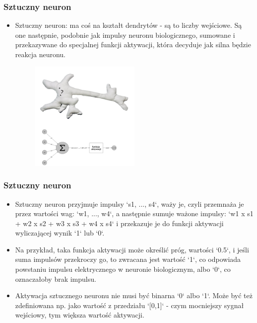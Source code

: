 \documentclass{beamer}
\begin{document}
\begin{frame}[fragile]
\frametitle{Sztuczny neuron}
\begin{itemize}
\item Sztuczny neuron: ma coś na kształt dendrytów - są to liczby wejściowe.  Są one następnie, podobnie jak impulsy neuronu biologicznego, sumowane i przekazywane do specjalnej funkcji aktywacji, która decyduje jak silna będzie reakcja neuronu.

                    \begin{figure}[h]
                        \centering
                        \includegraphics[width=0.5\textwidth]{../../img/neuron.png}
                    \end{figure}                    
                    \end{itemize}
\end{frame}

\begin{frame}[fragile]
\frametitle{Sztuczny neuron}
\begin{itemize}
\item Sztuczny neuron przyjmuje impulsy `s1, ..., s4`, waży je, czyli przemnaża je przez wartości wag: `w1, ..., w4`, a następnie sumuje ważone impulsy: `w1 x s1 + w2 x s2 + w3 x s3 + w4 x s4` i przekazuje je do funkcji aktywacji wyliczającej wynik `1` lub `0`.
\item Na przykład, taka funkcja aktywacji może określić próg, wartości `0.5`, i jeśli suma impulsów przekroczy go, to zwracana jest wartość `1`, co odpowiada powstaniu impulsu elektrycznego w neuronie biologicznym, albo `0`, co oznaczałoby brak impulsu. 
\item Aktywacja sztucznego neuronu nie musi być binarna `0` albo `1`. Może być też zdefiniowana np. jako wartość z przedziału `[0,1]` - czym mocniejszy sygnał wejściowy, tym większa wartość aktywacji. 
\end{itemize}
\end{frame}
\end{document}
